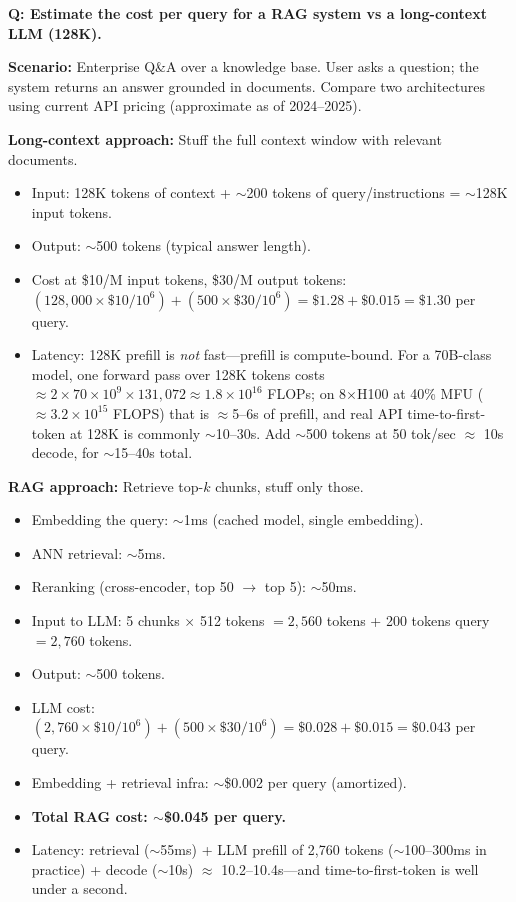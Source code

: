 \begin{interviewq}
\textbf{Q: Estimate the cost per query for a RAG system vs a long-context LLM (128K).}

 \quad {} \quad \badgefreq{\freqhigh}

\stronganswer

\textbf{Scenario:} Enterprise Q\&A over a knowledge base. User asks a question; the system returns an answer grounded in documents. Compare two architectures using current API pricing (approximate as of 2024--2025).

\textbf{Long-context approach:} Stuff the full context window with relevant documents.
\begin{itemize}
    \item Input: 128K tokens of context + $\sim$200 tokens of query/instructions = $\sim$128K input tokens.
    \item Output: $\sim$500 tokens (typical answer length).
    \item Cost at \$10/M input tokens, \$30/M output tokens: $(128{,}000 \times \$10 / 10^6) + (500 \times \$30 / 10^6) = \$1.28 + \$0.015 = \$1.30$ per query.
    \item Latency: 128K prefill is \textit{not} fast---prefill is compute-bound. For a 70B-class model, one forward pass over 128K tokens costs $\approx 2 \times 70 \times 10^9 \times 131{,}072 \approx 1.8 \times 10^{16}$ FLOPs; on 8$\times$H100 at 40\% MFU ($\approx 3.2 \times 10^{15}$ FLOPS) that is $\approx$5--6s of prefill, and real API time-to-first-token at 128K is commonly $\sim$10--30s. Add $\sim$500 tokens at 50 tok/sec $\approx$ 10s decode, for $\sim$15--40s total.
\end{itemize}

\textbf{RAG approach:} Retrieve top-$k$ chunks, stuff only those.
\begin{itemize}
    \item Embedding the query: $\sim$1ms (cached model, single embedding).
    \item ANN retrieval: $\sim$5ms.
    \item Reranking (cross-encoder, top 50 $\rightarrow$ top 5): $\sim$50ms.
    \item Input to LLM: 5 chunks $\times$ 512 tokens $= 2{,}560$ tokens + 200 tokens query $= 2{,}760$ tokens.
    \item Output: $\sim$500 tokens.
    \item LLM cost: $(2{,}760 \times \$10/10^6) + (500 \times \$30/10^6) = \$0.028 + \$0.015 = \$0.043$ per query.
    \item Embedding + retrieval infra: $\sim$\$0.002 per query (amortized).
    \item \textbf{Total RAG cost: $\sim$\$0.045 per query.}
    \item Latency: retrieval ($\sim$55ms) + LLM prefill of 2,760 tokens ($\sim$100--300ms in practice) + decode ($\sim$10s) $\approx$ 10.2--10.4s---and time-to-first-token is well under a second.
\end{itemize}


\end{interviewq}
